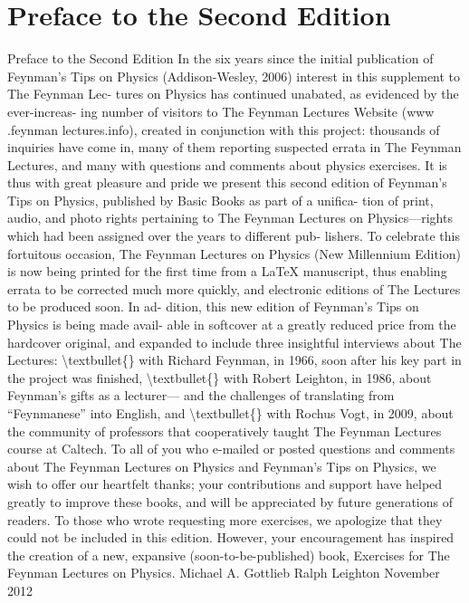 \documentclass[10pt,oneside]{article}
\begin{document}
\section*{Preface to the Second Edition}
\label{tips-sec-1-preface-to-the-second-edition}
Preface to the Second Edition In the six years since the initial publication of Feynman’s Tips on Physics (Addison-Wesley, 2006) interest in this supplement to The Feynman Lec- tures on Physics has continued unabated, as evidenced by the ever-increas- ing number of visitors to The Feynman Lectures Website (www .feynman lectures.info), created in conjunction with this project: thousands of inquiries have come in, many of them reporting suspected errata in The Feynman Lectures, and many with questions and comments about physics exercises. It is thus with great pleasure and pride we present this second edition of Feynman’s Tips on Physics, published by Basic Books as part of a unifica- tion of print, audio, and photo rights pertaining to The Feynman Lectures on Physics---rights which had been assigned over the years to different pub- lishers. To celebrate this fortuitous occasion, The Feynman Lectures on Physics (New Millennium Edition) is now being printed for the first time from a LaTeX manuscript, thus enabling errata to be corrected much more quickly, and electronic editions of The Lectures to be produced soon. In ad- dition, this new edition of Feynman’s Tips on Physics is being made avail- able in softcover at a greatly reduced price from the hardcover original, and expanded to include three insightful interviews about The Lectures: \textbackslash{}textbullet\{\} with Richard Feynman, in 1966, soon after his key part in the project was finished, \textbackslash{}textbullet\{\} with Robert Leighton, in 1986, about Feynman’s gifts as a lecturer--- and the challenges of translating from “Feynmanese” into English, and \textbackslash{}textbullet\{\} with Rochus Vogt, in 2009, about the community of professors that cooperatively taught The Feynman Lectures course at Caltech. To all of you who e-mailed or posted questions and comments about The Feynman Lectures on Physics and Feynman’s Tips on Physics, we wish to offer our heartfelt thanks; your contributions and support have helped greatly to improve these books, and will be appreciated by future generations of readers. To those who wrote requesting more exercises, we apologize that they could not be included in this edition. However, your encouragement has inspired the creation of a new, expansive (soon-to-be-published) book, Exercises for The Feynman Lectures on Physics. Michael A. Gottlieb Ralph Leighton November 2012\par
\end{document}
